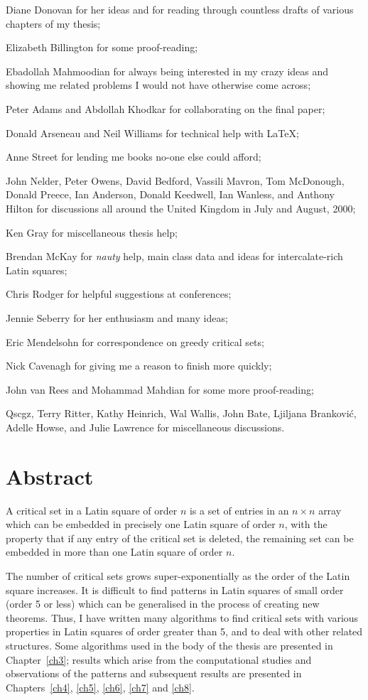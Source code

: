\documentclass[12pt]{report}
\begin{document}
Diane Donovan for her ideas and for reading through countless drafts
of various chapters of my thesis;

Elizabeth Billington for some proof-reading;

Ebadollah Mahmoodian for always being interested in my crazy ideas 
and showing me related problems I would not have otherwise come across;

Peter Adams and Abdollah Khodkar for collaborating on the final paper;

Donald Arseneau and Neil Williams for technical help with \LaTeX;

Anne Street for lending me books no-one else could afford;

John Nelder, Peter Owens, David Bedford, Vassili Mavron, Tom McDonough,
Donald Preece, Ian Anderson, Donald Keedwell, Ian Wanless, and Anthony Hilton
for discussions all around the United Kingdom in July and August, 2000;

Ken Gray for miscellaneous thesis help;

Brendan McKay for {\it nauty} help, main class data and ideas for
intercalate-rich Latin squares;
 
Chris Rodger for helpful suggestions at conferences;

Jennie Seberry for her enthusiasm and many ideas;

Eric Mendelsohn for correspondence on greedy critical sets;

Nick Cavenagh for giving me a reason to finish more quickly;

John van Rees and Mohammad Mahdian for some more proof-reading;

Qscgz, Terry Ritter, Kathy Heinrich, Wal Wallis, John Bate, Ljiljana
Brankovi{\'c}, Adelle Howse, and Julie Lawrence for miscellaneous discussions.

\tableofcontents
\listoffigures
\listoftables
\chapter*{Abstract}
A critical set in a Latin square of order $n$ is a set of entries in an
$n \times n$ array which can be embedded in precisely one Latin square
of order $n$, with the property that if any entry of the critical set
is deleted, the remaining set can be embedded in more than one Latin
square of order $n$.

The number of critical sets grows super-exponentially as the order of the
Latin square increases.  It is difficult to find patterns in Latin squares
of small order (order 5 or less) which can be generalised in the process
of creating new theorems.  Thus, I have written many algorithms to find
critical sets with various properties in Latin squares of order greater
than 5, and to deal with other related structures.  
Some algorithms used in the body of the thesis are presented in Chapter~\ref{ch3}; 
results which arise from the computational studies and observations
of the patterns and subsequent results are presented in Chapters~\ref{ch4}, \ref{ch5}, \ref{ch6}, \ref{ch7} and \ref{ch8}.
\end{document}
